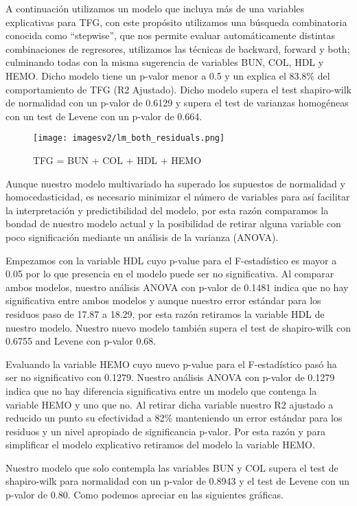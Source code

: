 \documentclass[runningheads,a4paper]{llncs}
\begin{document}
A continuación utilizamos un modelo que incluya más de una variables explicativas para TFG, con este propósito utilizamos una búsqueda combinatoria conocida como “stepwise”, que nos permite evaluar automáticamente distintas combinaciones de regresores, utilizamos las técnicas de backward, forward y both; culminando todas con la misma sugerencia de variables BUN, COL, HDL y HEMO.  Dicho modelo tiene un p-valor menor a 0.5 y un explica el 83.8\% del comportamiento de TFG (R2 Ajustado).  Dicho modelo supera el test shapiro-wilk de normalidad con un p-valor de 0.6129 y supera el test de varianzas homogéneas con un test de Levene con un p-valor de 0.664.

\begin{figure}[!ht]
\centering
\texttt{[image: imagesv2/lm\_both\_residuals.png]}
\caption{TFG = BUN + COL + HDL + HEMO }
\label{fig:lm_both_residuals}
\end{figure}

Aunque nuestro modelo multivariado ha superado los supuestos de normalidad y homocedasticidad, es necesario minimizar el número de variables para así facilitar la interpretación y predictibilidad del modelo, por esta razón comparamos la bondad de nuestro modelo actual y la posibilidad de retirar alguna variable con poco significación mediante un análisis de la varianza (ANOVA).

Empezamos con la variable HDL cuyo p-value para el F-estadístico  es mayor a 0.05 por lo que presencia en el modelo puede ser no significativa. Al comparar ambos modelos, nuestro análisis ANOVA con p-valor de 0.1481  indica que no hay significativa entre ambos modelos y aunque nuestro error estándar para los residuos paso de 17.87 a 18.29, por esta razón retiramos la variable HDL de nuestro modelo. Nuestro nuevo modelo también supera el test de shapiro-wilk con 0.6755 and Levene con p-valor 0.68.

Evaluando la variable HEMO cuyo nuevo p-value para el F-estadístico pasó ha ser no significativo con 0.1279. Nuestro análisis ANOVA con p-valor de 0.1279 indica que no hay diferencia significativa entre un modelo que contenga la variable HEMO y uno que no. Al retirar dicha variable nuestro R2 ajustado a reducido un punto su efectividad a 82\% manteniendo un error estándar para los residuos y un nivel apropiado de significancia p-valor. Por esta razón y para simplificar el modelo explicativo retiramos del modelo la variable HEMO. 

Nuestro modelo que solo contempla las variables BUN y COL supera el test de shapiro-wilk para normalidad con un p-valor de 0.8943 y el test de Levene con un p-valor de 0.80. Como podemos apreciar en las siguientes gráficas.
\end{document}
